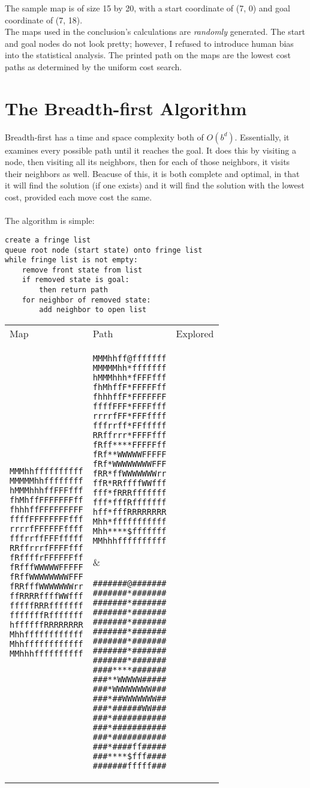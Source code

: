 \documentclass[12pt, article]{scrartcl}
\begin{document}
The sample map is of size 15 by 20, with a start coordinate of (7, 0) and goal coordinate of (7, 18). \\

The maps used in the conclusion's calculations are \emph{randomly} generated. The start and goal nodes do not look pretty; however, I refused to introduce human bias into the statistical analysis. The printed path on the maps are the lowest cost paths as determined by the uniform cost search. \\

\section{The Breadth-first Algorithm}
Breadth-first has a time and space complexity both of $O(b^{d})$. Essentially, it examines every possible path until it reaches the goal. It does this by visiting a node, then visiting all its neighbors, then for each of those neighbors, it visits their neighbors as well. Beacuse of this, it is both complete and optimal, in that it will find the solution (if one exists) and it will find the solution with the lowest cost, provided each move cost the same. \\ \\

The algorithm is simple: 

\begin{verbatim}
create a fringe list
queue root node (start state) onto fringe list
while fringe list is not empty:
    remove front state from list
    if removed state is goal:
        then return path
    for neighbor of removed state:
        add neighbor to open list
\end{verbatim}

\begin{tabular}{p{2in} p{2in} p{2in}}
Map & Path & Explored \\
\begin{verbatim}
MMMhhffffffffff
MMMMMhhffffffff
hMMMhhhffFFFfff
fhMhffFFFFFFFff
fhhhffFFFFFFFFF
ffffFFFFFFFFfff
rrrrfFFFFFFffff
fffrrffFFFfffff
RRffrrrfFFFFfff
fRffffrFFFFFFff
fRfffWWWWWFFFFF
fRffWWWWWWWWFFF
fRRfffWWWWWWWrr
ffRRRRffffWWfff
fffffRRRfffffff
fffffffRfffffff
hffffffRRRRRRRR
Mhhffffffffffff
Mhhffffffffffff
MMhhhffffffffff
\end{verbatim}
&
\begin{verbatim}
MMMhhff@fffffff
MMMMMhh*fffffff
hMMMhhh*fFFFfff
fhMhffF*FFFFFff
fhhhffF*FFFFFFF
ffffFFF*FFFFfff
rrrrfFF*FFFffff
fffrrff*FFfffff
RRffrrr*FFFFfff
fRff****FFFFFff
fRf**WWWWWFFFFF
fRf*WWWWWWWWFFF
fRR*ffWWWWWWWrr
ffR*RRffffWWfff
fff*fRRRfffffff
fff*fffRfffffff
hff*fffRRRRRRRR
Mhh*fffffffffff
Mhh****$fffffff
MMhhhffffffffff
\end{verbatim}
&
\begin{verbatim}
#######@#######
#######*#######
#######*#######
#######*#######
#######*#######
#######*#######
#######*#######
#######*#######
#######*#######
####****#######
###**WWWWW#####
###*WWWWWWWW###
###*##WWWWWWW##
###*######WW###
###*###########
###*###########
###*###########
###*####ff#####
###****$fff####
#######fffff###
\end{verbatim}
\end{tabular}
\end{document}
